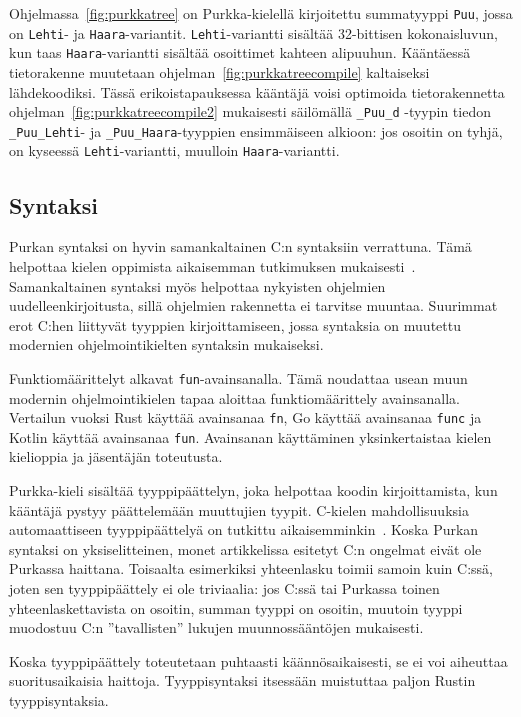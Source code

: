 Ohjelmassa~\ref{fig:purkkatree} on Purkka-kielellä kirjoitettu summatyyppi
\texttt{Puu}, jossa on \texttt{Lehti}- ja \texttt{Haara}-variantit.
\texttt{Lehti}-variantti sisältää 32-bittisen kokonaisluvun, kun taas
\texttt{Haara}-variantti sisältää osoittimet kahteen alipuuhun. Kääntäessä
tietorakenne muutetaan ohjelman~\ref{fig:purkkatreecompile} kaltaiseksi
lähdekoodiksi. Tässä erikoistapauksessa kääntäjä voisi optimoida
tietorakennetta ohjelman~\ref{fig:purkkatreecompile2} mukaisesti säilömällä
\texttt{\_Puu\_d} -tyypin tiedon \texttt{\_Puu\_Lehti}- ja
\texttt{\_Puu\_Haara}-tyyppien ensimmäiseen alkioon: jos osoitin on tyhjä, on
kyseessä \texttt{Lehti}-variantti, muulloin \texttt{Haara}-variantti.

\subsection{Syntaksi}

Purkan syntaksi on hyvin samankaltainen C:n syntaksiin verrattuna. Tämä
helpottaa kielen oppimista aikaisemman tutkimuksen
mukaisesti~\citep{languagelearning}. Samankaltainen syntaksi myös helpottaa
nykyisten ohjelmien uudelleenkirjoitusta, sillä ohjelmien rakennetta ei
tarvitse muuntaa. Suurimmat erot C:hen liittyvät tyyppien kirjoittamiseen,
jossa syntaksia on muutettu modernien ohjelmointikielten syntaksin mukaiseksi.

Funktiomäärittelyt alkavat \texttt{fun}-avainsanalla. Tämä noudattaa usean muun
modernin ohjelmointikielen tapaa aloittaa funktiomäärittely avainsanalla.
Vertailun vuoksi Rust käyttää avainsanaa \texttt{fn}, Go käyttää avainsanaa
\texttt{func} ja Kotlin käyttää avainsanaa \texttt{fun}. Avainsanan
käyttäminen yksinkertaistaa kielen kielioppia ja jäsentäjän toteutusta.

Purkka-kieli sisältää tyyppipäättelyn, joka helpottaa koodin kirjoittamista,
kun kääntäjä pystyy päättelemään muuttujien tyypit. C-kielen mahdollisuuksia
automaattiseen tyyppipäättelyä on tutkittu
aikaisemminkin~\citep[mm.][]{ctypeinference}. Koska Purkan syntaksi on
yksiselitteinen, monet artikkelissa esitetyt C:n ongelmat eivät ole Purkassa
haittana. Toisaalta esimerkiksi yhteenlasku toimii samoin kuin C:ssä, joten sen
tyyppipäättely ei ole triviaalia: jos C:ssä tai Purkassa toinen
yhteenlaskettavista on osoitin, summan tyyppi on osoitin, muutoin tyyppi
muodostuu C:n ''tavallisten'' lukujen muunnossääntöjen mukaisesti.

Koska tyyppipäättely toteutetaan puhtaasti käännösaikaisesti, se ei voi
aiheuttaa suoritusaikaisia haittoja. Tyyppisyntaksi itsessään muistuttaa paljon
Rustin tyyppisyntaksia.

